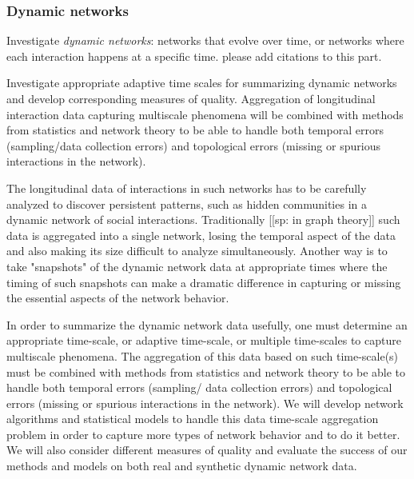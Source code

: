 \documentclass[11pt]{NSFamsart}
\begin{document}
\subsubsection*{Dynamic networks}
Investigate {\it dynamic networks}: networks that evolve over time, or networks where each interaction happens at a specific time.  
{\color{cyan}please add citations to this part.} 

Investigate appropriate adaptive time scales  for summarizing dynamic networks and develop corresponding measures of quality. 
Aggregation of longitudinal interaction data capturing multiscale phenomena will be combined with methods from statistics and network theory to be able to handle both temporal errors (sampling/data collection errors) and topological errors (missing or spurious interactions in the network).

The longitudinal data of interactions in such networks has to be carefully analyzed to discover persistent patterns, such as hidden communities in a dynamic network of social interactions. Traditionally 
 		[[sp: in graph theory]] 
such data is aggregated into a single network, losing the temporal aspect of the data and also making its size difficult to analyze simultaneously. Another way is to take "snapshots" of the dynamic network data at appropriate times where the timing of such snapshots can make a dramatic difference in capturing or missing the essential aspects of the network behavior. 

In order to summarize the dynamic network data usefully, one must determine an appropriate time-scale, or adaptive time-scale, or multiple time-scales to capture multiscale phenomena. The aggregation of this data based on such time-scale(s) must be combined with methods from statistics and network theory to be able to handle both temporal errors (sampling/ data collection errors) and topological errors (missing or spurious interactions in the network).  We will develop network algorithms and statistical models to handle this data time-scale aggregation problem in order to capture more types of network behavior and to do it better.  We will also consider different measures of quality and evaluate the success of our methods and models on both real and synthetic dynamic network data.
\end{document}
